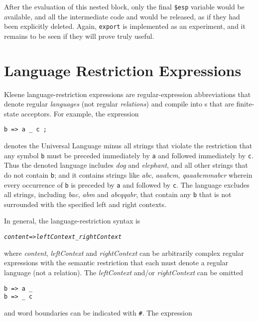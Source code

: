 \noindent
After the evaluation of this nested block, only the final \verb!$esp!
variable would be available, and all the intermediate code and  
would be released, as if they had been explicitly deleted.
Again, \texttt{export} is implemented as an experiment, and it remains
to be seen if they will prove truly useful.

\section{Language Restriction Expressions}

Kleene language-restriction expressions are regular-expression
abbreviations that denote regular \emph{languages} (not regular
\emph{relations}) and compile into \fsm{}s that are finite-state
acceptors.  For
example, the expression

\begin{Verbatim}
b => a _ c ;
\end{Verbatim}

\noindent
denotes the Universal Language minus all strings that violate
the restriction that any symbol \texttt{b} must
be preceded immediately by \texttt{a} and followed immediately by
\texttt{c}.  Thus the denoted language includes \emph{dog} and
\emph{elephant}, and all other strings that do not contain
\texttt{b}; and it contains strings like \emph{abc}, \emph{aaabcm},
\emph{qaaabcmmabcr} wherein every occurrence of \texttt{b} is
preceded by \texttt{a} and followed by \texttt{c}.  The language
excludes all strings, including \emph{bac}, \emph{abm} and
\emph{abcqqabr}, that contain any \texttt{b} that is not surrounded
with the specified left and right contexts.

In general, the language-restriction syntax is

\begin{alltt}
\emph{content} => \emph{leftContext} _ \emph{rightContext}
\end{alltt}

\noindent
where \emph{content}, \emph{leftContext} and \emph{rightContext}
can be arbitrarily complex regular expressions with the semantic
restriction that each must denote a regular language (not a
relation).  The \emph{leftContext} and/or \emph{rightContext} can
be omitted

\begin{Verbatim}
b => a _
b => _ c
\end{Verbatim}

\noindent
and word boundaries can be indicated with \texttt{\#}.  The
expression

